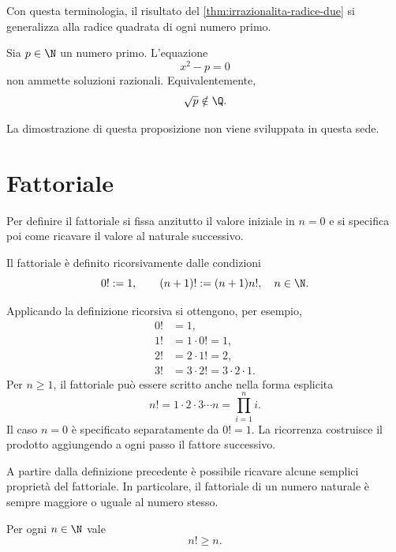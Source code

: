 Con questa terminologia, il risultato del
\cref{thm:irrazionalita-radice-due} si generalizza alla radice quadrata
di ogni numero primo.

\begin{proposition}
\label{prop:irrazionalita-radice-primo}
Sia \(p\in\N\) un numero primo. L'equazione
\[
  x^2-p=0
\]
non ammette soluzioni razionali. Equivalentemente,
\[
  \sqrt{p}\notin\Q.
\]
\end{proposition}

La dimostrazione di questa proposizione non viene sviluppata in questa sede.

\section{Fattoriale}
\label{sec:lez02-fattoriale}

Per definire il fattoriale si fissa anzitutto il valore iniziale in
\(n=0\) e si specifica poi come ricavare il valore al naturale successivo.

\begin{definition}[Fattoriale]
\label{def:fattoriale}
Il fattoriale è definito ricorsivamente dalle condizioni
\[
  0!:=1,
  \qquad
  (n+1)!:=(n+1)n!,
  \quad n\in\N.
\]
\end{definition}

Applicando la definizione ricorsiva si ottengono, per esempio,
\begin{align*}
  0!&=1,\\
  1!&=1\cdot0!=1,\\
  2!&=2\cdot1!=2,\\
  3!&=3\cdot2!=3\cdot2\cdot1.
\end{align*}
Per \(n\ge1\), il fattoriale può essere scritto anche nella forma esplicita
\[
  n!=1\cdot2\cdot3\cdots n=\prod_{i=1}^{n}i.
\]
Il caso \(n=0\) è specificato separatamente da \(0!=1\). La ricorrenza
costruisce il prodotto aggiungendo a ogni passo il fattore successivo.

A partire dalla definizione precedente è possibile ricavare alcune
semplici proprietà del fattoriale. In particolare, il fattoriale di un
numero naturale è sempre maggiore o uguale al numero stesso.

\begin{proposition}
\label{prop:fattoriale-maggiore-n}
Per ogni \(n\in\N\) vale
\[
  n!\ge n.
\]
\end{proposition}


